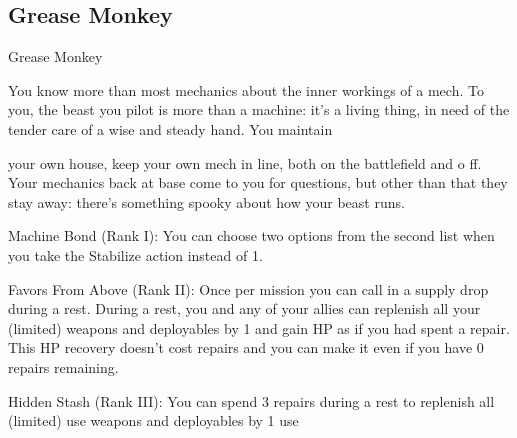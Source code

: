 \subsection{Grease Monkey}

                                              Grease Monkey  

You know more than most mechanics about the inner workings of a mech. To you, the beast you pilot is  
more than a machine: it’s a living thing, in need of the tender care of a wise and steady hand. You maintain  

                                                                                                                  


your own house, keep your own mech in line, both on the battlefield and o ff. Your mechanics back at base  
come to you for questions, but other than that they stay away: there’s something spooky about how your  
beast runs.   

Machine Bond (Rank I): You can choose two options from the second list when you take the  
Stabilize action instead of 1.
 
Favors From Above (Rank II): Once per mission you can call in a supply drop during a rest.  
During a rest, you and any of your allies can replenish all your (limited) weapons and deployables  
by 1 and gain HP as if you had spent a repair. This HP recovery doesn’t cost repairs and you can  
make it even if you have 0 repairs remaining.
 
Hidden Stash (Rank III): You can spend 3 repairs during a rest to replenish all (limited) use  
weapons and deployables by 1 use